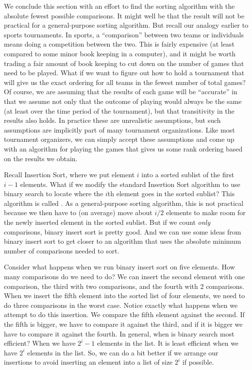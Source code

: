 We conclude this section with an effort to find the sorting algorithm
with the absolute fewest possible comparisons.
It might well be that the result will not be practical for a
general-purpose sorting algorithm.
But recall our analogy earlier to sports tournaments.
In sports, a ``comparison'' between two teams or individuals means
doing a competition between the two.
This is fairly expensive (at least compared to some minor book keeping
in a computer), and it might be worth trading a fair amount
of book keeping to cut down on the number of games that need to be
played.
What if we want to figure out how to hold a tournament that will give
us the exact ordering for all teams in the fewest number of total
games?
Of course, we are assuming that the results of each game will be
``accurate'' in that we assume not only that the outcome of 
playing  would always be the same (at least over the time
period of the tournament), but that transitivity in
the results also holds.
In practice these are unrealistic assumptions, but such assumptions
are implicitly part of many tournament organizations.
Like most tournament organizers, we can simply accept these
assumptions and come up with an algorithm for playing the games that
gives us some rank ordering based on the results we obtain.

Recall Insertion Sort, where we put
element \(i\) into a sorted sublist of the first \(i-1\) elements.
What if we modify the standard Insertion Sort algorithm to use binary
search to locate where the \(i\)th element goes in the sorted sublist?
This algorithm is called .
As a general-purpose sorting algorithm, this is not practical because
we then have to (on average) move about \(i/2\) elements to make room
for the newly inserted element in the sorted sublist.
But if we count \emph{only} comparisons, binary insert sort is pretty
good.
And we can use some ideas from binary insert sort to get closer to an
algorithm that uses the absolute minimum number of comparisons needed
to sort.

Consider what happens when we run binary insert sort on five elements.
How many comparisons do we need to do?
We can insert the second element with one comparison, the third with
two comparisons,
and the fourth with 2 comparisons.
When we insert the fifth element into the sorted list of four
elements, we need to do three comparisons in the worst case.
Notice exactly what happens when we attempt to do this insertion.
We compare the fifth element against the second.
If the fifth is bigger, we have to compare it against the third, and
if it is bigger we have to compare it against the fourth.
In general, when is binary search most efficient?
When we have \(2^i - 1\) elements in the list.
It is least efficient when we have \(2^i\) elements in the list.
So, we can do a bit better if we arrange our insertions to avoid
inserting an element into a list of size \(2^i\) if possible.

